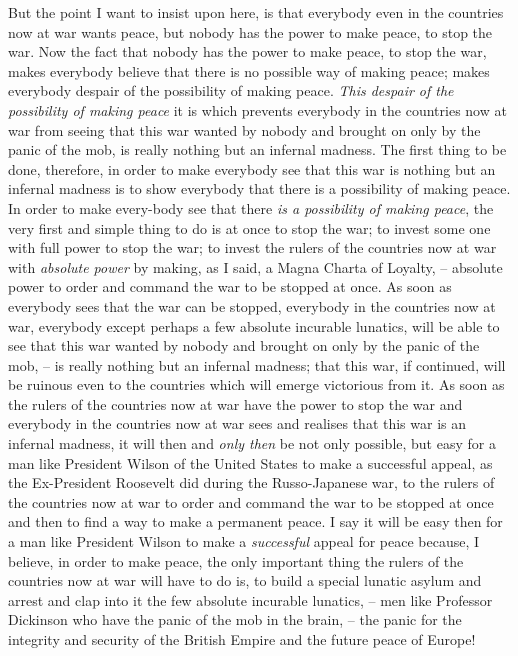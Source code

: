But the point I want to insist upon here, is that everybody even in the countries now at war wants peace,
but nobody has the power to make peace, to stop the war.
Now the fact that nobody has the power to make peace, to stop the war,
makes everybody believe that there is no possible way of making peace;
makes everybody despair of the possibility of making peace.
\emph{This despair of the possibility of making peace}
it is which prevents everybody in the countries now at war from seeing
that this war wanted by nobody and brought on only by the panic of the mob,
is really nothing but an infernal madness.
The first thing to be done, therefore,
in order to make everybody see that this war is nothing but an infernal madness
is to show everybody that there is a possibility of making peace.
In order to make every-body see that there \emph{is a possibility of making peace},
the very first and simple thing to do is at once to stop the war;
to invest some one with full power to stop the war; to invest the rulers of the countries now at war with \emph{absolute power} by making, as I said, a Magna Charta of Loyalty,
-- absolute power to order and command the war to be stopped at once.
As soon as everybody sees that the war can be stopped,
everybody in the countries now at war, everybody except perhaps a few absolute incurable lunatics,
will be able to see that this war wanted by nobody and brought on only by the panic of the mob,
-- is really nothing but an infernal madness;
that this war, if continued, will be ruinous even to the countries which will emerge victorious from it.
As soon as the rulers of the countries now at war have the power to stop the war and everybody in the countries now at war sees and realises that this war is an infernal madness,
it will then and \emph{only then} be not only possible, but easy for a man like President Wilson of the United States to make a successful appeal,
as the Ex-President Roosevelt did during the Russo-Japanese war,
to the rulers of the countries now at war to order and command the war to be stopped at once and then to find a way to make a permanent peace.
I say it will be easy then for a man like President Wilson
to make a \emph{successful} appeal for peace
because, I believe, in order to make peace,
the only important thing the rulers of the countries now at war will have to do is,
to build a special lunatic asylum and arrest and clap into it the few absolute incurable lunatics,
-- men like Professor Dickinson who have the panic of the mob in the brain,
-- the panic for the integrity and security of the British Empire and the future peace of Europe!

